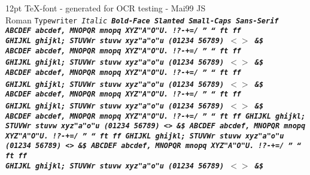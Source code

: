 %
\topmargin=-25mm         \textheight=140mm       %
\oddsidemargin=-10mm     \evensidemargin=-10mm
\textwidth=160mm         %

\setlength{\parskip}{1.5ex plus0.5ex minus 0.5ex} %
\parindent0mm

\pagestyle{empty}
\renewcommand{\arraystretch}{1.5} %

12pt TeX-font - generated for OCR testing - Mai99 JS
\\ \rm Roman \tt Typewriter \it Italic \bf Bold-Face
   \sl Slanted \sc Small-Caps \sf Sans-Serif
\rm %
\\ ABCDEF abcdef, MNOPQR mnopq XYZ"A"O"U. !?-+=/ '' `` ft ff
\\ GHIJKL ghijkl; STUVWr stuvw xyz"a"o"u \3 (01234 56789) $<>$ \&\$
\tt %
\\ ABCDEF abcdef, MNOPQR mnopq XYZ"A"O"U. !?-+=/ '' `` ft ff
\\ GHIJKL ghijkl; STUVWr stuvw xyz"a"o"u \3 (01234 56789) $<>$ \&\$
\it %
\\ ABCDEF abcdef, MNOPQR mnopq XYZ"A"O"U. !?-+=/ '' `` ft ff
\\ GHIJKL ghijkl; STUVWr stuvw xyz"a"o"u \3 (01234 56789) $<>$ \&\$
\bf %
\\ ABCDEF abcdef, MNOPQR mnopq XYZ"A"O"U. !?-+=/ '' `` ft ff
\\ GHIJKL ghijkl; STUVWr stuvw xyz"a"o"u \3 (01234 56789) $<>$ \&\$
\sl %
\\ ABCDEF abcdef, MNOPQR mnopq XYZ"A"O"U. !?-+=/ '' `` ft ff
\\ GHIJKL ghijkl; STUVWr stuvw xyz"a"o"u \3 (01234 56789) $<>$ \&\$
\sc %
\\ ABCDEF abcdef, MNOPQR mnopq XYZ"A"O"U. !?-+=/ '' `` ft ff
\\ GHIJKL ghijkl; STUVWr stuvw xyz"a"o"u \3 (01234 56789) $<>$ \&\$
\sf %
\\ ABCDEF abcdef, MNOPQR mnopq XYZ"A"O"U. !?-+=/ '' `` ft ff
\\ GHIJKL ghijkl; STUVWr stuvw xyz"a"o"u \3 (01234 56789) $<>$ \&\$

